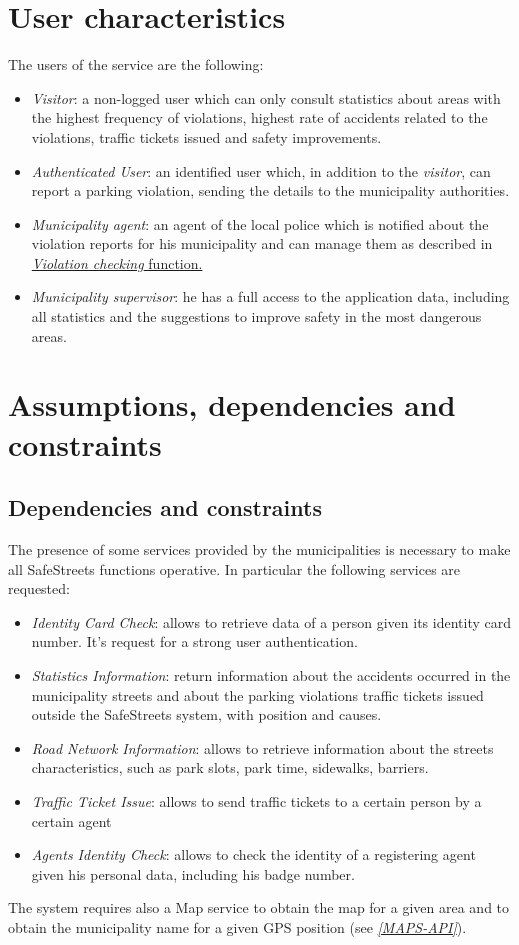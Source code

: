 \documentclass[a4paper]{report}
\begin{document}
\section{User characteristics}
The users of the service are the following:
\begin{itemize}
\item \textit{Visitor}: a non-logged user which can only consult statistics about areas with the highest frequency of violations, highest rate of accidents related to the violations, traffic tickets issued and safety improvements. 
\item \textit{Authenticated User}: an identified user which, in addition to the \textit{visitor}, can report a parking violation, sending the details to the municipality authorities.
\item \textit{Municipality agent}: an agent of the local police which is notified about the violation reports for his municipality and can manage them as described in \hyperref[sub-agentfun]{\textit{Violation checking} function.}
\item \textit{Municipality supervisor}: he has a full access to the application data, including all statistics and the suggestions to improve safety in the most dangerous areas.
\end{itemize}
\section{Assumptions, dependencies and constraints}
\subsection{Dependencies and constraints}
\label{SS-Dep&Const} 
The presence of some services provided by the municipalities is necessary to make all SafeStreets functions operative. In particular the following services are requested:
\begin{itemize}
\item \textit{Identity Card Check}: allows to retrieve data of a person given its identity card number.  It's request for a strong user authentication.
\item \textit{Statistics Information}: return information about the accidents occurred in the municipality streets and about the parking violations traffic tickets issued outside the SafeStreets system, with position and causes.
\item \textit{Road Network Information}: allows to retrieve information about the streets characteristics, such as park slots, park time, sidewalks, barriers.
\item \textit{Traffic Ticket Issue}: allows to send traffic tickets to a certain person by a certain agent
\item \textit{Agents Identity Check}: allows to check the identity of a registering agent given his personal data, including his badge number. 
\end{itemize}
The system requires also a Map service to obtain the map for a given area and to obtain the municipality name for a given GPS position (see \hyperref[ref:maps-api]{\textit{[MAPS-API]}}). 
\end{document}
